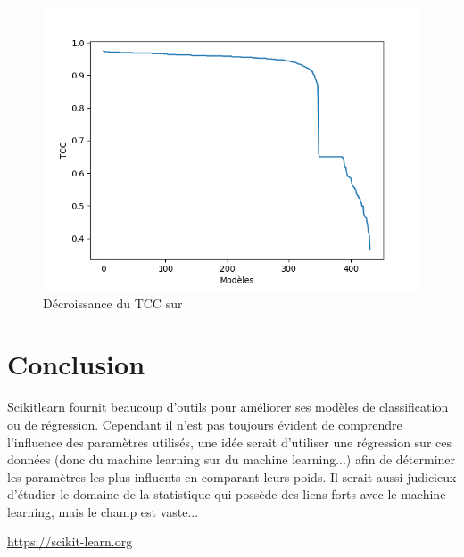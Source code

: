 \documentclass[10pt,letterpaper]{article}
\begin{document}
\begin{figure}[H]
\centering
\includegraphics[scale=0.65]{dj_pmc_2.png}
\caption{Décroissance du TCC sur\protect{}}
\end{figure}

\section*{Conclusion}

Scikitlearn fournit beaucoup d’outils pour améliorer ses modèles de classification ou de régression. Cependant il n’est pas toujours évident de comprendre l’influence des paramètres utilisés, une idée serait d’utiliser une régression sur ces données (donc du machine learning sur du machine learning...) afin de déterminer les paramètres les plus influents en comparant leurs poids. Il serait aussi judicieux d’étudier le domaine de la statistique qui possède des liens forts avec le machine learning, mais le champ est vaste...

%
%
% 
\vspace{15mm}
\begin{thebibliography}{10}

\url{https://scikit-learn.org}

\end{thebibliography}
\end{document}
